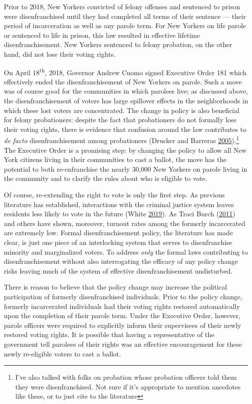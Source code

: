 \documentclass[]{article}
\let\rmarkdownfootnote\footnote%
\def\footnote{\protect\rmarkdownfootnote}
\begin{document}
Prior to 2018, New Yorkers convicted of felony offenses and sentenced to prison were disenfranchised until they had completed all terms of their sentence --- their period of incarceration as well as any parole term. For New Yorkers on life parole or sentenced to life in prison, this law resulted in effective lifetime disenfranchisement. New Yorkers sentenced to felony probation, on the other hand, did not lose their voting rights.

On April 18\textsuperscript{th}, 2018, Governor Andrew Cuomo signed Executive Order 181 which effectively ended the disenfranchisement of New Yorkers on parole. Such a move was of course good for the communities in which parolees live; as discussed above, the disenfranchisement of voters has large spillover effects in the neighborhoods in which these lost voters are concentrated. The change in policy is also beneficial for felony probationers: despite the fact that probationers do not formally lose their voting rights, there is evidence that confusion around the law contributes to \emph{de facto} disenfranchisement among probationers (Drucker and Barreras \protect\hyperlink{ref-Drucker2005}{2005}).\footnote{I've also talked with folks on probation whose probation officers told them they were disenfranchised. Not sure if it's appropriate to mention anecdotes like these, or to just cite to the literature} The Executive Order is a promising step: by changing the policy to allow all New York citizens living in their communities to cast a ballot, the move has the potential to both re-enfranchise the nearly 30,000 New Yorkers on parole living in the community and to clarify the rules about who is eligible to vote.

Of course, re-extending the right to vote is only the first step. As previous literature has established, interactions with the criminal justice system leaves residents less likely to vote in the future (White \protect\hyperlink{ref-White2019}{2019}). As Traci Burch (\protect\hyperlink{ref-Burch2011}{2011}) and others have shown, moreover, turnout rates among the formerly incarcerated are extremely low. Formal disenfranchisement policy, the literature has made clear, is just one piece of an interlocking system that serves to disenfranchise minority and marginalized voters. To address \emph{only} the formal laws contributing to disenfranchisement without also interrogating the efficacy of any policy change risks leaving much of the system of effective disenfranchisement undisturbed.

There is reason to believe that the policy change may increase the political participation of formerly disenfranchised individuals. Prior to the policy change, formerly incarcerated individuals had their voting rights restored automatically upon the completion of their parole term. Under the Executive Order, however, parole officers were required to explicitly inform their supervisees of their newly restored voting rights. It is possible that having a representative of the government tell parolees of their rights was an effective encouragement for these newly re-eligible voters to cast a ballot.
\end{document}
